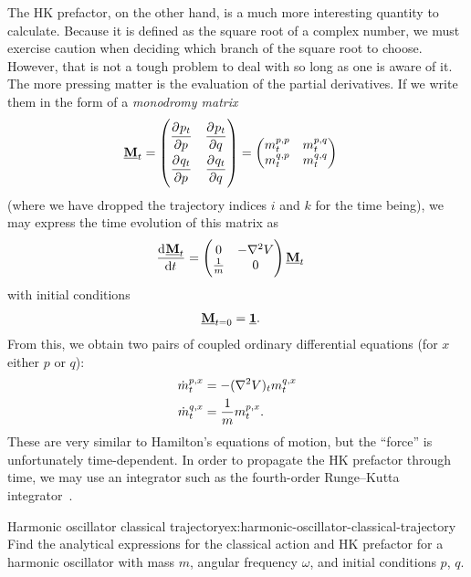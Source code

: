 The HK prefactor, on the other hand, is a much more interesting quantity to calculate.
Because it is defined as the square root of a complex number, we must exercise caution when deciding which branch of the square root to choose.
However, that is not a tough problem to deal with so long as one is aware of it.
The more pressing matter is the evaluation of the partial derivatives.
If we write them in the form of a \emph{monodromy matrix}
\begin{align}
	\mat{M}_t
	&= \begin{pmatrix}
			\dpd{p_t}{p} & \dpd{p_t}{q} \\[3 mm]
			\dpd{q_t}{p} & \dpd{q_t}{q}
		\end{pmatrix}
	= \begin{pmatrix}
			m\coh{p}{p}_t & m\coh{p}{q}_t \\
			m\coh{q}{p}_t & m\coh{q}{q}_t
		\end{pmatrix}
\end{align}
(where we have dropped the trajectory indices $i$ and $k$ for the time being), we may express the time evolution of this matrix as~\cite{garashchuk2000simplified,gelabert2000log}
\begin{align}
	\dod{\mat{M}_t}{t}
	&= \begin{pmatrix}
			0 & -\nabla^2 V \\
			\frac{1}{m} & 0
		\end{pmatrix}
		\mat{M}_t
\end{align}
with initial conditions
\begin{align}
	\underline{\bm{\mathbf{M}}}_{t=0}
	&= \underline{\bm{\mathbf{1}}}.
\end{align}
From this, we obtain two pairs of coupled ordinary differential equations (for $x$ either $p$ or $q$):
\begin{subequations}
\begin{align}
	\dot{m}^{p,x}_t
	&= -(\nabla^2 V)_t m^{q,x}_t \\
	\dot{m}^{q,x}_t
	&= \frac{1}{m} m^{p,x}_t.
\end{align}
\end{subequations}
These are very similar to Hamilton's equations of motion, but the ``force'' is unfortunately time-dependent.
In order to propagate the HK prefactor through time, we may use an integrator such as the fourth-order Runge--Kutta integrator~\cite[710-713]{press1992numerical}.

\begin{DefExercise}{Harmonic oscillator classical trajectory}{ex:harmonic-oscillator-classical-trajectory}
	Find the analytical expressions for the classical action and HK prefactor for a harmonic oscillator with mass $m$, angular frequency $\omega$, and initial conditions $p$, $q$.
\end{DefExercise}

